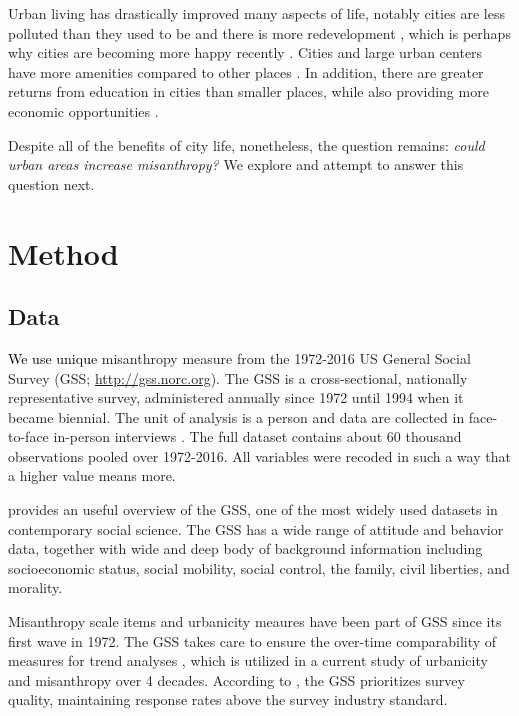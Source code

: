 \documentclass[11pt, letterpaper]{article}
\newcommand{\hilite}[1]{\textcolor{black}{#1}}
\begin{document}
\begin{spacing}{1.4}
 Urban living has drastically improved many aspects of life, notably cities are
 less polluted than they used to be and there is more redevelopment
 \citep[e.g.,][]{glaeser11},  which is perhaps why  cities are becoming more
 happy recently \citep{aok-swbGenYcity18}. Cities and large urban centers have more amenities compared to other places \citep{osullivan09}. In addition, there are greater returns from education in cities than smaller places, while also providing more economic opportunities \citep{florida13}.

Despite all of the benefits of city life, nonetheless, the question  remains: \textit{could urban areas increase misanthropy?} We explore and attempt to answer this question next. 

\section*{Method} 

\subsection*{Data}

\hilite{We use unique} misanthropy measure from the 1972-2016 US General Social Survey (GSS;
\url{http://gss.norc.org}). The GSS is a cross-sectional, nationally
representative survey, administered annually since 1972 until 1994 when it
became biennial. The unit of analysis is a person and data are collected in face-to-face in-person interviews \citep{davis07}. The full dataset contains about 60 thousand observations pooled over 1972-2016. All variables were recoded in such a way that a higher value means more. 

\citet{marsden20} provides an useful overview  of the GSS, one of the most
widely used datasets in contemporary social science. The GSS has a wide range of
attitude and behavior data, together with  wide and deep body of background
information including socioeconomic status, social mobility,
social control, the family, civil liberties, and morality. %
%

Misanthropy scale items and urbanicity
meaures have been part of GSS since its first wave in 1972. 
 The GSS takes care to ensure the over-time comparability of measures for trend
 analyses \citep{marsden20}, which is  utilized in a current study of urbanicity and misanthropy
 over 4 decades. According to \citet{marsden20}, the GSS prioritizes survey quality, maintaining response rates above the survey industry standard.


\end{spacing}
\end{document}
